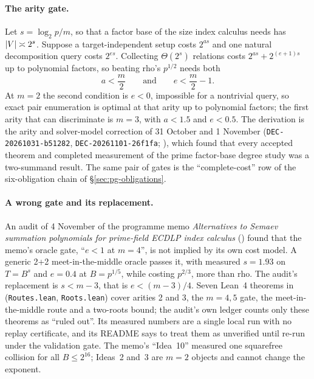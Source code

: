 \paragraph{The arity gate.} Let $s=\log_2 p/m$, so that a factor base of
the size index calculus needs has $\lvert V \rvert\asymp 2^s$. Suppose a
target-independent setup costs $2^{as}$ and one natural decomposition query
costs $2^{es}$. Collecting $\Theta(2^s)$ relations costs
$2^{as}+2^{(e+1)s}$ up to polynomial factors, so beating rho's $p^{1/2}$
needs both
\[
  a<\frac m2 \qquad\text{and}\qquad e<\frac m2-1 .
\]
At $m=2$ the second condition is $e<0$, impossible for a nontrivial query,
so exact pair enumeration is optimal at that arity up to polynomial
factors; the first arity that can discriminate is $m=3$, with $a<1.5$ and
$e<0.5$. The derivation is the arity and solver-model correction of 31
October and 1 November (\texttt{DEC-20261031-b51282},
\texttt{DEC-20261101-26f1fa};
),
which found that every accepted theorem and completed measurement of the
prime factor-base degree study was a two-summand result. The same pair of
gates is the ``complete-cost'' row of the six-obligation chain of
\S\ref{sec:pg-obligations}.

\paragraph{A wrong gate and its replacement.} An audit of 4 November of the
programme memo \emph{Alternatives to Semaev summation polynomials for
prime-field ECDLP index calculus}
() found that the memo's
oracle gate, ``$e<1$ at $m=4$'', is not implied by its own cost model. A
generic 2+2 meet-in-the-middle oracle passes it, with measured $s=1.93$ on
$T=B^s$ and $e=0.4$ at $B=p^{1/5}$, while costing $p^{2/3}$, more than rho.
The audit's replacement is $s<m-3$, that is $e<(m-3)/4$. Seven Lean~4
theorems in 
(\texttt{Routes.lean}, \texttt{Roots.lean}) cover arities 2 and 3, the
$m=4,5$ gate, the meet-in-the-middle route and a two-roots bound; the
audit's own ledger counts only these theorems as ``ruled out''. Its
measured numbers are a single local run with no replay certificate, and
its README says to treat them as unverified until re-run under the
validation gate. The memo's ``Idea~10'' measured one squarefree collision
for all $B\le2^{16}$; Ideas~2 and~3 are $m=2$ objects and cannot change the
exponent.

